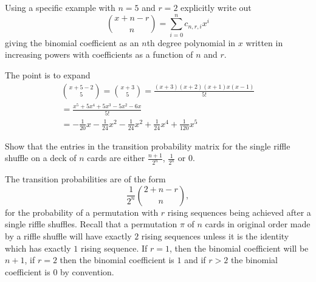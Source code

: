 \documentclass[12pt]{article}
\begin{document}
\begin{exercise}
    Using a specific example with \( n=5 \) and \( r = 2 \) explicitly
    write out
    \[
        \binom{x + n - r}{n} = \sum\limits_{i=0}^n c_{n,r,i} x^i
    \] giving the binomial coefficient as an \( n \)th degree polynomial
    in \( x \) written in increasing powers with coefficients as a
    function of \( n \) and \( r \).
\end{exercise}
\begin{solution}
    The point is to expand
    \begin{multline*}
        \binom{x+5 - 2}{5} = \binom{x+3}{5} = \frac{(x+3)(x+2)(x+1)x(x-1)}
        {5!} \\
        = \frac{x^5 + 5 x^4 + 5 x^3 - 5 x^2 - 6 x}{5!} \\
        = - \frac{1}{20} x - \frac{1}{24} x^2 - \frac{1}{24} x^2 + \frac
        {1}{24} x^4 + \frac{1}{120} x^5
    \end{multline*}
\end{solution}

\begin{exercise}
    Show that the entries in the transition probability matrix for the
    single riffle shuffle on a deck of \( n \) cards are either \( \frac
    {n+1}{2^n} \), \( \frac{1}{2^n} \) or \( 0 \).
\end{exercise}
\begin{solution}
    The transition probabilities are of the form
    \[
        \frac{1}{2^{n}} \binom{2 +n - r}{n},
    \] for the probability of a permutation with \( r \) rising
    sequences being achieved after a single riffle shuffles.  Recall
    that a permutation \( \pi \) of \( n \) cards in original order made
    by a riffle shuffle will have exactly \( 2 \) rising sequences
    unless it is the identity which has exactly \( 1 \) rising sequence.
    If \( r = 1 \), then the binomial coefficient will be \( n+1 \), if \(
    r = 2 \) then the binomial coefficient is \( 1 \) and if \( r > 2 \)
    the binomial coefficient is \( 0 \) by convention.
\end{solution}
\end{document}

